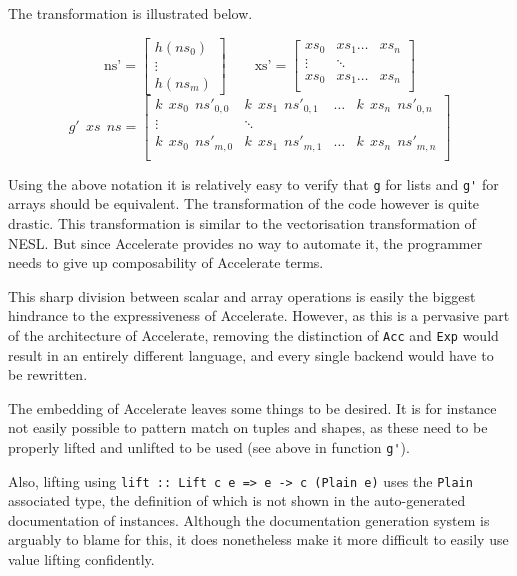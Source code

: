 The transformation is illustrated below.

\[
\textrm{ns'} =
\begin{bmatrix}
  h(ns_0) \\
  \vdots \\
  h(ns_m)
\end{bmatrix}
\qquad
\textrm{xs'} =
\begin{bmatrix}
  xs_0 & xs_1 \ldots & xs_n \\
  \vdots & \ddots \\
  xs_0 & xs_1 \ldots & xs_n \\
\end{bmatrix}
\]
\[
g'\ \ xs\ \ ns =
\begin{bmatrix}
  k\ \ xs_0\ \ ns'_{0,0} & k\ \ xs_1\ \ ns'_{0,1} & \ldots &  k\ \ xs_n\ \ ns'_{0,n}  \\
\vdots & \ddots \\
  k\ \ xs_0\ \ ns'_{m,0} & k\ \ xs_1\ \ ns'_{m,1}  & \ldots &  k\ \ xs_n\ \ ns'_{m,n}   \\
\end{bmatrix}
\]

Using the above notation it is relatively easy to verify that \lstinline{g} for
lists and \lstinline{g'} for arrays should be equivalent.  The transformation of
the code however is quite drastic.  This transformation is similar to the
vectorisation transformation of NESL\cite{nesl}.  But since Accelerate provides
no way to automate it, the programmer needs to give up composability of
Accelerate terms.

This sharp division between scalar and array operations is easily the biggest
hindrance to the expressiveness of Accelerate. However, as this is a pervasive
part of the architecture of Accelerate, removing the distinction of
\lstinline{Acc} and \lstinline{Exp} would result in an entirely different language,
and every single backend would have to be rewritten.

The embedding of Accelerate leaves some things to be desired. It is for
instance not easily possible to pattern match on tuples and shapes, as these
need to be properly lifted and unlifted to be used (see above in function \lstinline{g'}).

Also, lifting using \lstinline{lift :: Lift c e => e -> c (Plain e)} uses the
\lstinline{Plain} associated type, the definition of which is not shown in the
auto-generated documentation of instances. Although the documentation
generation system is arguably to blame for this, it does nonetheless make it
more difficult to easily use value lifting confidently.

